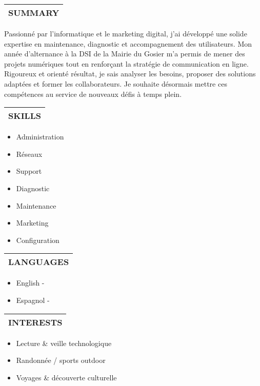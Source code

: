 \documentclass{article}
\makeatletter
\newcommand{\cvsection}[1]{%
  \par\bigskip
  \begin{tabular}{@{}p{\linewidth}}
  \textbf{\Large #1}\\[3pt]\hline
  \end{tabular}\medskip}
\makeatother
\begin{document}
\begin{paracol}{2}
\switchcolumn
\centering
{}


\cvsection{SUMMARY}
Passionné par l’informatique et le marketing digital, j’ai développé une solide expertise en maintenance, diagnostic et accompagnement des utilisateurs. Mon année d’alternance à la DSI de la Mairie du Gosier m’a permis de mener des projets numériques tout en renforçant la stratégie de communication en ligne. Rigoureux et orienté résultat, je sais analyser les besoins, proposer des solutions adaptées et former les collaborateurs. Je souhaite désormais mettre ces compétences au service de nouveaux défis à temps plein.

\cvsection{SKILLS}
\begin{itemize}[leftmargin=*]
\item Administration
\item Réseaux
\item Support
\item Diagnostic
\item Maintenance
\item Marketing
\item Configuration\end{itemize}

\cvsection{LANGUAGES}
\begin{itemize}[leftmargin=*]
\item English - \textcolor{gray}{}
\item Espagnol - \textcolor{gray}{}\end{itemize}

\cvsection{INTERESTS}
\begin{itemize}[leftmargin=*]
\item Lecture \& veille technologique
\item Randonnée / sports outdoor
\item Voyages \& découverte culturelle
\end{itemize}

\end{paracol}
\end{document}

